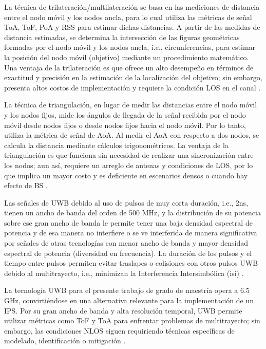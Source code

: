 La técnica de trilateración/multilateración se basa en las mediciones de distancia entre el nodo móvil y los nodos ancla, para lo cual utiliza las métricas de señal ToA, ToF, PoA y RSS para estimar dichas distancias. A partir de las medidas de distancia estimadas, se determina la intersección de las figuras geométricas formadas por el nodo móvil y los nodos ancla, i.e., circunferencias, para estimar la posición del nodo móvil (objetivo) mediante un procedimiento matemático. Una ventaja de la trilateración es que ofrece un alto desempeño en términos de exactitud y precisión en la estimación de la localización del objetivo; sin embargo, presenta altos costos de implementación y requiere la condición LOS en el canal \cite{ref6}.

La técnica de triangulación, en lugar de medir las distancias entre el nodo móvil y los nodos fijos, mide los ángulos de llegada de la señal recibida por el nodo móvil desde nodos fijos o desde nodos fijos hacia el nodo móvil. Por lo tanto, utiliza la métrica de señal de AoA. Al medir el AoA con respecto a dos nodos, se calcula la distancia mediante cálculos trigonométricos. La ventaja de la triangulación es que funciona sin necesidad de realizar una sincronización entre los nodos; aun así, requiere un arreglo de antenas y condiciones de LOS, por lo que implica un mayor costo y es deficiente en escenarios densos o cuando hay efecto de BS \cite{ref6}.

Las señales de UWB debido al uso de pulsos de muy corta duración, i.e., 2ns, tienen un ancho de banda del orden de 500 MHz, y la distribución de su potencia sobre ese gran ancho de banda le permite tener una baja densidad espectral de potencia y de esa manera no interfiere o se ve interferida de manera significativa por señales de otras tecnologías con menor ancho de banda y mayor densidad espectral de potencia (diversidad en frecuencia). La duración de los pulsos y el tiempo entre pulsos permiten evitar traslapes o colisiones con otros pulsos UWB debido al multitrayecto, i.e., minimizan la Interferencia Intersimbólica (\gls{isi}) \cite{ref8}.

La tecnología UWB para el presente trabajo de grado de maestría opera a 6.5 GHz, convirtiéndose en una alternativa relevante para la implementación de un IPS. Por su gran ancho de banda y alta resolución temporal, UWB permite utilizar métricas como ToF y ToA para enfrentar problemas de multitrayecto; sin embargo, las condiciones NLOS siguen requiriendo técnicas específicas de modelado, identificación o mitigación \cite{ref8, ref9, ref10, ref11, ref12}.

